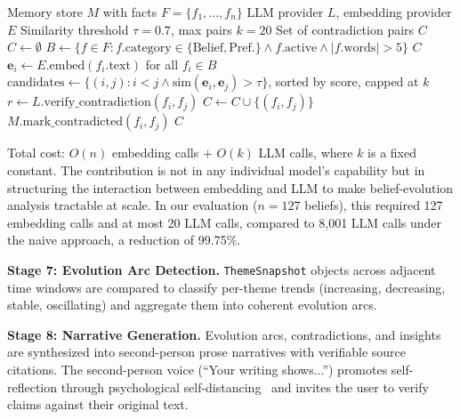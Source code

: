 \documentclass[conference]{IEEEtran}
\begin{document}
\begin{algorithm}[t]
\caption{Contradiction Detection}
\label{alg:contradiction}
\begin{algorithmic}[1]
\REQUIRE Memory store $M$ with facts $F = \{f_1, \ldots, f_n\}$
\REQUIRE LLM provider $L$, embedding provider $E$
\REQUIRE Similarity threshold $\tau = 0.7$, max pairs $k = 20$
\ENSURE Set of contradiction pairs $C$
\STATE $C \leftarrow \emptyset$
\STATE $B \leftarrow \{f \in F : f.\text{category} \in \{\text{Belief}, \text{Pref.}\} \wedge f.\text{active} \wedge |f.\text{words}| > 5\}$
    \RETURN $C$
\ENDIF
\STATE $\mathbf{e}_i \leftarrow E.\text{embed}(f_i.\text{text})$ for all $f_i \in B$ 
\STATE $\text{candidates} \leftarrow \{(i,j) : i < j \wedge \text{sim}(\mathbf{e}_i, \mathbf{e}_j) > \tau\}$, sorted by score, capped at $k$
    \STATE $r \leftarrow L.\text{verify\_contradiction}(f_i, f_j)$ 
        \STATE $C \leftarrow C \cup \{(f_i, f_j)\}$
        \STATE $M.\text{mark\_contradicted}(f_i, f_j)$
    \ENDIF
\ENDFOR
\RETURN $C$
\end{algorithmic}
\end{algorithm}

Total cost: $O(n)$ embedding calls $+$ $O(k)$ LLM calls, where $k$ is a fixed constant. The contribution is not in any individual model's capability but in structuring the interaction between embedding and LLM to make belief-evolution analysis tractable at scale. In our evaluation ($n{=}127$ beliefs), this required 127 embedding calls and at most 20 LLM calls, compared to 8,001 LLM calls under the naive approach, a reduction of 99.75\%.

\textbf{Stage 7: Evolution Arc Detection.} \texttt{ThemeSnapshot} objects across adjacent time windows are compared to classify per-theme trends (increasing, decreasing, stable, oscillating) and aggregate them into coherent evolution arcs.

\textbf{Stage 8: Narrative Generation.} Evolution arcs, contradictions, and insights are synthesized into second-person prose narratives with verifiable source citations. The second-person voice (``Your writing shows...'') promotes self-reflection through psychological self-distancing~\cite{kross2017selfdistancing} and invites the user to verify claims against their original text.

\end{document}
